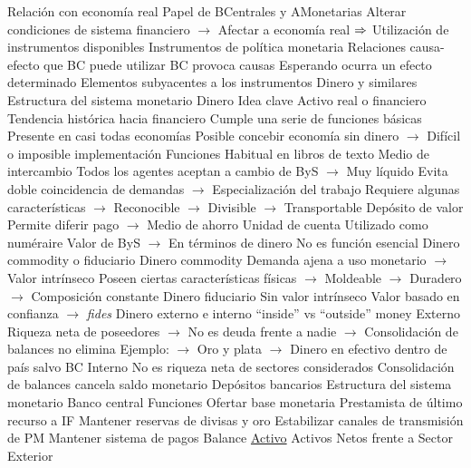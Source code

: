 \documentclass{nuevotema}
\begin{document}
\begin{esquemal}
				\4 Relación con economía real
				\4 Papel de BCentrales y AMonetarias
				\4[] Alterar condiciones de sistema financiero
				\4[] $\to$ Afectar a economía real
				\4[] $\Rightarrow$ Utilización de instrumentos disponibles
			\3 Instrumentos de política monetaria
				\4 Relaciones causa-efecto que BC puede utilizar
				\4[] BC provoca causas
				\4[] Esperando ocurra un efecto determinado
				\4 Elementos subyacentes a los instrumentos
				\4[] Dinero y similares
				\4[] Estructura del sistema monetario
		\2 Dinero
			\3 Idea clave
				\4 Activo real o financiero
				\4[] Tendencia histórica hacia financiero
				\4 Cumple una serie de funciones básicas
				\4 Presente en casi todas economías
				\4[] Posible concebir economía sin dinero
				\4[] $\to$ Difícil o imposible implementación
			\3 Funciones
				\4 Habitual en libros de texto
				\4[I] Medio de intercambio
				\4[] Todos los agentes aceptan a cambio de ByS
				\4[] $\to$ Muy líquido
				\4[] Evita doble coincidencia de demandas
				\4[] $\to$ Especialización del trabajo
				\4[] Requiere algunas características
				\4[] $\to$ Reconocible
				\4[] $\to$ Divisible
				\4[] $\to$ Transportable
				\4[II] Depósito de valor
				\4[] Permite diferir pago
				\4[] $\to$ Medio de ahorro
				\4[III] Unidad de cuenta
				\4[] Utilizado como numéraire
				\4[] Valor de ByS
				\4[] $\to$ En términos de dinero
				\4[] No es función esencial
			\3 Dinero commodity o fiduciario
				\4 Dinero commodity
				\4[] Demanda ajena a uso monetario
				\4[] $\to$ Valor intrínseco
				\4[] Poseen ciertas características físicas
				\4[] $\to$ Moldeable
				\4[] $\to$ Duradero
				\4[] $\to$ Composición constante
				\4 Dinero fiduciario
				\4[] Sin valor intrínseco
				\4[] Valor basado en confianza $\to$ \textit{fides}
			\3 Dinero externo e interno
				\4 ``inside'' vs ``outside'' money
				\4 Externo
				\4[] Riqueza neta de poseedores
				\4[] $\to$ No es deuda frente a nadie
				\4[] $\to$ Consolidación de balances no elimina
				\4[] Ejemplo:
				\4[] $\to$ Oro y plata
				\4[] $\to$ Dinero en efectivo dentro de país salvo BC
				\4 Interno
				\4[] No es riqueza neta de sectores considerados
				\4[] Consolidación de balances cancela saldo monetario
				\4[] Depósitos bancarios
		\2 Estructura del sistema monetario
			\3 Banco central
				\4 Funciones
				\4[] Ofertar base monetaria
				\4[] Prestamista de último recurso a IF
				\4[] Mantener reservas de divisas y oro
				\4[] Estabilizar canales de transmisión de PM
				\4[] Mantener sistema de pagos
				\4 Balance
				\4[] \underline{Activo}
				\4[] Activos Netos frente a Sector Exterior

\end{esquemal}
\end{document}
